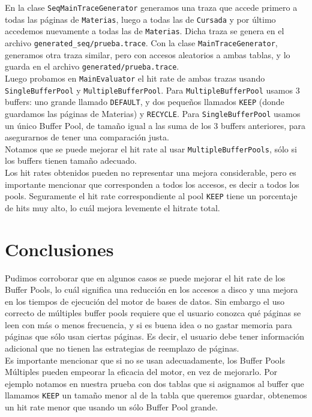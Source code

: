 \documentclass[a4paper,10pt]{article}
\begin{document}
En la clase \texttt{SeqMainTraceGenerator} generamos una traza que accede primero a todas las p\'aginas de \texttt{Materias}, luego a todas las de \texttt{Cursada} y por \'ultimo accedemos nuevamente a todas las de \texttt{Materias}. Dicha traza se genera en el archivo \texttt{generated\_seq/prueba.trace}.
Con la clase \texttt{MainTraceGenerator}, generamos otra traza similar, pero con accesos aleatorios a ambas tablas, y lo guarda en el archivo \texttt{generated/prueba.trace}.\\


Luego probamos en \texttt{MainEvaluator} el hit rate de ambas trazas usando \texttt{SingleBufferPool} y \texttt{MultipleBufferPool}. Para \texttt{MultipleBufferPool} usamos 3 buffers: uno grande llamado \texttt{DEFAULT}, y dos peque\~nos llamados \texttt{KEEP} (donde guardamos las p\'aginas de Materias) y \texttt{RECYCLE}. Para \texttt{SingleBufferPool} usamos un \'unico Buffer Pool, de tama\~no igual a las suma de los 3 buffers anteriores, para asegurarnos de tener una comparaci\'on justa.\\

Notamos que se puede mejorar el hit rate al usar \texttt{MultipleBufferPools}, s\'olo si los buffers tienen tama\~no adecuado.\\


Los hit rates obtenidos pueden no representar una mejora considerable, pero es importante mencionar que corresponden a todos los accesos, es decir a todos los pools. Seguramente el hit rate correspondiente al pool \texttt{KEEP} tiene un porcentaje de hits muy alto, lo cu\'al mejora levemente el hitrate total.

\section{Conclusiones}

Pudimos corroborar que en algunos casos se puede mejorar el hit rate de los Buffer Pools, lo cu\'al significa una reducci\'on en los accesos a disco y una mejora en los tiempos de ejecución del motor de bases de datos. Sin embargo el uso correcto de m\'ultiples buffer pools requiere que el usuario conozca qu\'e p\'aginas se leen con m\'as o menos frecuencia, y si es buena idea o no gastar memoria para p\'aginas que s\'olo usan ciertas p\'aginas. Es decir, el usuario debe tener informaci\'on adicional que no tienen las estrategias de reemplazo de p\'aginas.\\

Es importante mencionar que si no se usan adecuadamente, los Buffer Pools M\'ultiples pueden empeorar la eficacia del motor, en vez de mejorarlo. Por ejemplo notamos en nuestra prueba con dos tablas que si asignamos al buffer que llamamos \texttt{KEEP} un tama\~no menor al de la tabla que queremos guardar, obtenemos un hit rate menor que usando un s\'olo Buffer Pool grande.
\end{document}
